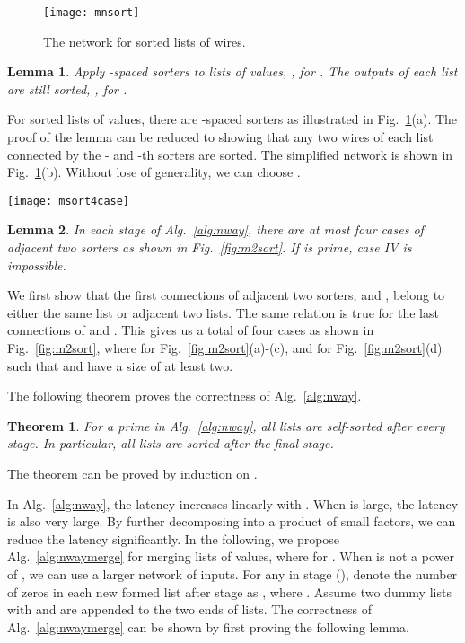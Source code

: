 \documentclass[10pt,journal,cspaper,compsoc]{IEEEtran}
\newtheorem{thm}{Theorem}[section]
\newtheorem{lemma}{Lemma}[section]
\begin{document}
\begin{figure}[!t]
\centering
\texttt{[image: mnsort]}
\caption{The network for  sorted lists of  wires.}
\label{fig:mnsort}
\end{figure}



\begin{lemma}
  Apply -spaced sorters to  lists of  values, , for . The outputs of each list are still sorted, , for .
\label{lm:subgroupsort}
\end{lemma}
For  sorted lists of  values, there are  -spaced sorters as illustrated in Fig.~\ref{fig:mnsort}(a). The proof of the lemma can be reduced to showing that any two wires  of each list connected by the - and -th sorters are sorted. The simplified network is shown in Fig.~\ref{fig:mnsort}(b). Without lose of generality, we can choose .

\begin{figure*}[!t]
\centering
\texttt{[image: msort4case]}
\caption{Adjacent two sorters  and  in each stage of Alg.~\ref{alg:nway} can be classified into four four cases. (a) Case I (); (b) Case II (); (c) Case III (); (d) Case IV ().}
\label{fig:m2sort}
\end{figure*}

\begin{lemma}
  In each stage of Alg.~\ref{alg:nway}, there are at most four cases of adjacent two sorters as shown in Fig.~\ref{fig:m2sort}. If  is prime, case IV is impossible.
\label{lm:sorter4case}
\end{lemma}
We first show that the first connections of adjacent two sorters,  and , belong to either the same list or adjacent two lists. The same relation is true for the last connections of  and . This gives us a total of four cases as shown in Fig.~\ref{fig:m2sort}, where  for Fig.~\ref{fig:m2sort}(a)-(c), and  for Fig.~\ref{fig:m2sort}(d) such that  and  have a size of at least two.

The following theorem proves the correctness of Alg.~\ref{alg:nway}.
\begin{thm}
  For a prime  in Alg.~\ref{alg:nway}, all lists are self-sorted after every stage. In particular, all lists are sorted after the final stage.
\label{thm:groupsort}
\end{thm}
The theorem can be proved by induction on .




In Alg.~\ref{alg:nway}, the latency increases linearly with . When  is large, the latency is also very large. By further decomposing  into a product of small factors, we can reduce the latency significantly.
In the following, we propose Alg.~\ref{alg:nwaymerge} for merging  lists of  values, where  for . When  is not a power of , we can use a larger network of  inputs.
For any  in stage  (), denote the number of zeros in each new formed list after stage  as , where . Assume two dummy lists with  and  are appended to the two ends of  lists.
The correctness of Alg.~\ref{alg:nwaymerge} can be shown by first proving the following lemma.
\end{document}
